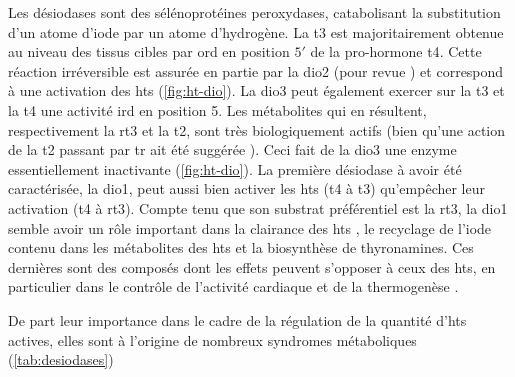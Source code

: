 \documentclass[../main.tex]{subfiles}
\begin{document}
			Les désiodases sont des sélénoprotéines peroxydases, catabolisant la substitution d'un atome d'iode par un atome d'hydrogène.
			La \gls{t3} est majoritairement obtenue au niveau des tissus cibles par \gls{ord} en position $5\prime$ de la pro-hormone \gls{t4}.
			Cette réaction irréversible est assurée en partie par la \gls{dio2} (pour revue \citealp{Williams2011}) et correspond à une activation des \glspl{ht} (\autoref{fig:ht-dio}).
			La \gls{dio3} peut également exercer sur la \gls{t3} et la \gls{t4} une activité \gls{ird} en position 5.
			Les métabolites qui en résultent, respectivement la \gls{rt3} et la \gls{t2}, sont très biologiquement actifs (bien qu'une action de la \gls{t2} passant par \gls{tr} ait été suggérée \citealp{Mendoza2013}).
			Ceci fait de la \gls{dio3} une enzyme essentiellement inactivante (\autoref{fig:ht-dio}).
			La première désiodase à avoir été caractérisée, la \gls{dio1}, peut aussi bien activer les \glspl{ht} (\gls{t4} à \gls{t3}) qu'empêcher leur activation (\gls{t4} à \gls{rt3}).
			Compte tenu que son substrat préférentiel est la \gls{rt3}, la \gls{dio1} semble avoir un rôle important dans la clairance des \glspl{ht} \citep{Maia2011}, le recyclage de l'iode contenu dans les métabolites des \glspl{ht} \citep{Schneider2006} et la biosynthèse de thyronamines.
			Ces dernières sont des composés dont les effets peuvent s'opposer à ceux des \glspl{ht}, en particulier dans le contrôle de l'activité cardiaque et de la thermogenèse \citep{Scanlan2004}.
			\par
			De part leur importance dans le cadre de la régulation de la quantité d'\glspl{ht} actives, elles sont à l'origine de nombreux syndromes métaboliques (\autoref{tab:desiodases})

			
\end{document}
